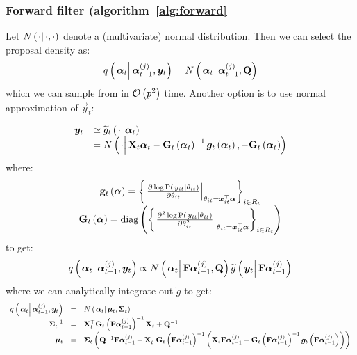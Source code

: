 \subsubsection*{Forward filter (algorithm~\ref{alg:forward}}
Let $\normalC{\cdot}{\cdot}{\cdot}$ denote a (multivariate) normal distribution. Then we can select the proposal density as:
\begin{equation}
	\IDC{\vec{\alpha}_t}{\partic{\vec{\alpha}}{t-1}{j}, \vec{y}_t} = %
		\normalC{\vec{\alpha}_t}{\partic{\vec{\alpha}}{t-1}{j}}{\mat{Q}}
\end{equation}%
%
which we can sample from in $\mathcal{O}\left( p^2\right)$ time. Another option is to use normal approximation of $\vec{y}_t$:

\begin{equation}\begin{array}{cl}
	\vec{y}_t & \simeq  \optorC{\widetilde{g}_t}{\cdot}{\vec{\alpha}_t} \\ &= %
		\normalC{
			\cdot
		}{ %
			\mat{X}_t\vec{\alpha}_t - 
			\mat{G}_t\Lparen{\vec{\alpha}_t}^{-1}
			\vec{g}_t\Lparen{\vec{\alpha}_t}		
		}{ %
			- \mat{G}_t\Lparen{\vec{\alpha}_t}
		}
\end{array}\end{equation}
%
% 
where:
\begin{equation}\begin{array}{c}
\mat{g}_t\Lparen{\vec{\alpha}} = 
		\Lbrace{\left.\frac{
		\partial \log \propC{y_{it}}{\theta_{it}}
	}{
		\partial\theta_{it}
	}\right|_{\theta_{it} = \vec{x}_{it}^\top\vec{\alpha}} }_{i \in R_t} \\
%
	\mat{G}_t\Lparen{\vec{\alpha}} = 
		\diag{\Lbrace{\left.\frac{
		\partial^2 \log \propC{y_{it}}{\theta_{it}}
	}{
		\partial\theta_{it}^2
	}\right|_{\theta_{it} = \vec{x}_{it}^\top\vec{\alpha}} }_{i \in R_t}}
\end{array}\end{equation}
%
%
to get:
\begin{equation}
	\IDC{\vec{\alpha}_t}{\partic{\vec{\alpha}}{t-1}{j}, \vec{y}_t} \propto %
		\normalC{\vec{\alpha}_t}{\mat{F}\partic{\vec{\alpha}}{t-1}{j}}{\mat{Q}}
		\optorC{\widetilde{g}}{\vec{y}_t}{\mat{F}\partic{\vec{\alpha}}{t-1}{j}}
\end{equation}
%
where we can analytically integrate out $\widetilde{g}$ to get:
%
%
\begin{equation}\begin{array}{rcl}
	\IDC{\vec{\alpha}_t}{\partic{\vec{\alpha}}{t-1}{j}, \vec{y}_t} &=&  %
		\normalC{\vec{\alpha}_t}{\vec{\mu}_t}{\mat{\Sigma}_t} \\
%
	\mat{\Sigma}_t^{-1} &=& \mat{X}_t^\top \mat{G}_t\Lparen{\mat{F}\partic{\vec{\alpha}}{t-1}{j}}^{-1}\mat{X}_t + \mat{Q}^{-1}  \\
%
	\vec{\mu}_t &=& \mat{\Sigma}_t\Lparen{
		\mat{Q}^{-1}\mat{F}\partic{\vec{\alpha}}{t-1}{j} + 
		\mat{X}_t^\top \mat{G}_t\Lparen{\mat{F}\partic{\vec{\alpha}}{t-1}{j}}^{-1}
		\Lparen{
			\mat{X}_t\mat{F}\partic{\vec{\alpha}}{t-1}{j} - 
			\mat{G}_t\Lparen{\mat{F}\partic{\vec{\alpha}}{t-1}{j}}^{-1}
			\vec{g}_t\Lparen{\mat{F}\partic{\vec{\alpha}}{t-1}{j}}
		}
	}
\end{array}\end{equation}


